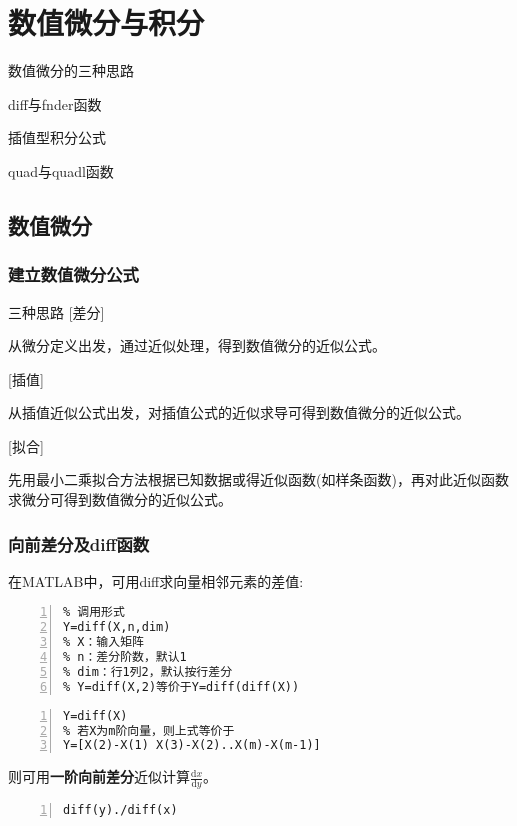 \chapter{数值微分与积分}
\begin{introduction}
\item 数值微分的三种思路
\item diff与fnder函数
\item 插值型积分公式
\item quad与quadl函数
\end{introduction}
\section{数值微分}
\subsection{建立数值微分公式}
\begin{definition}{三种思路}{}
[差分]

从微分定义出发，通过近似处理，得到数值微分的近似公式。

[插值]

从插值近似公式出发，对插值公式的近似求导可得到数值微分的近似公式。

[拟合]

先用最小二乘拟合方法根据已知数据或得近似函数(如样条函数)，再对此近似函数求微分可得到数值微分的近似公式。
\end{definition}
\subsection{向前差分及diff函数}
在MATLAB中，可用diff求向量相邻元素的差值:
\begin{lstlisting}[frame=single,numbers=left]
% 向前差分函数diff
% 调用形式
Y=diff(X,n,dim)
% X：输入矩阵
% n：差分阶数，默认1
% dim：行1列2，默认按行差分
% Y=diff(X,2)等价于Y=diff(diff(X))
\end{lstlisting}

\begin{lstlisting}[frame=single,numbers=left]
% 常用形式
Y=diff(X)
% 若X为m阶向量，则上式等价于
Y=[X(2)-X(1) X(3)-X(2)..X(m)-X(m-1)]
\end{lstlisting}

\newpage

则可用\textcolor{third}{\textbf{一阶向前差分}}近似计算$\frac{\mathrm{d}x}{\mathrm{d}y}$。
\begin{lstlisting}[frame=single,numbers=left]
diff(y)./diff(x)
\end{lstlisting}



